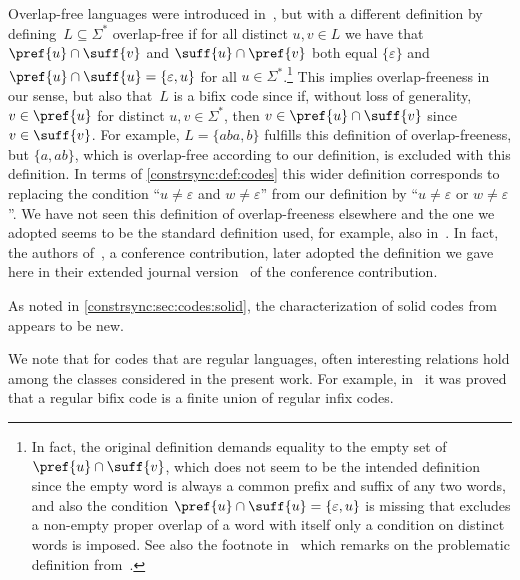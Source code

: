 Overlap-free languages were introduced in~\cite{DBLP:conf/cocoon/HanW06},
but with a different definition
by defining~$L \subseteq \Sigma^*$ overlap-free if for all distinct $u,v \in L$
we have that $\pref{u} \cap \suff{v}$ and $\suff{u} \cap \pref{v}$
both equal $\{\varepsilon\}$ and $\pref{u} \cap \suff{u} = \{\varepsilon, u\}$
for all $u \in \Sigma^*$.\footnote{In fact, the original definition
demands equality to the empty set of $\pref{u}\cap \suff{v}$, which does not seem to be the intended
definition since the empty word is always a common prefix and suffix
of any two words,  and also the condition
$\pref{u}\cap \suff{u} = \{\varepsilon, u\}$ is missing that excludes a non-empty proper overlap
of a word with itself only a condition on distinct words is imposed. See also the footnote in~\cite[p.~33]{DBLP:journals/tcs/JurgensenS21} which
remarks on the problematic definition from~\cite{DBLP:conf/cocoon/HanW06}.}
This implies overlap-freeness in our sense, but also that~$L$
is a bifix code since if, without loss of generality,
$v \in \pref{u}$ for distinct $u,v \in \Sigma^*$, then $v \in \pref{u} \cap \suff{v}$ since $v \in \suff{v}$.
For example, $L = \{aba, b\}$ fulfills this definition of overlap-freeness,
but $\{a,ab\}$, which is overlap-free according to our definition,
is excluded with this definition. In terms of \cref{constrsync:def:codes}
this wider definition corresponds to replacing the condition
``$u \ne \varepsilon$ and $w \ne \varepsilon$'' from our definition
by ``$u \ne \varepsilon$ or $w \ne \varepsilon$''. We have not seen
this definition of overlap-freeness elsewhere and the one we adopted
seems to be the standard definition used, for example, 
also in~\cite{DBLP:journals/ijfcs/HanS11,DBLP:journals/iandc/Jurgensen08,DBLP:reference/hfl/JurgensenK97,DBLP:journals/tcs/JurgensenS21,DBLP:journals/jalc/KonstantinidisY10}.
In fact, the authors of~\cite{DBLP:conf/cocoon/HanW06}, a conference contribution,
later adopted the definition we gave here in their extended journal version~\cite{DBLP:journals/ijfcs/HanS11}
of the conference contribution.

As noted in \cref{constrsync:sec:codes:solid}, the characterization of solid codes
from  appears to be new.

We note that for codes that are regular languages, often interesting relations hold among the classes
considered in the present work. For example, in~\cite{DBLP:journals/jalc/Konstantinidis20}
it was proved that a regular bifix code is a finite union of regular infix codes.



